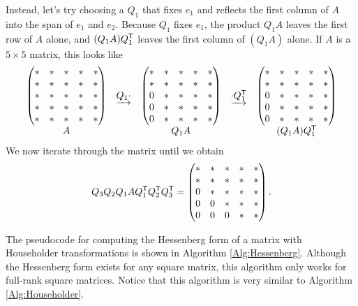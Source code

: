 Instead, let's try choosing a $Q_1$ that fixes $e_1$ and reflects the first column of $A$ into the span of $e_1$ and $e_2$. 
Because $Q_1$ fixes $e_1$, the product $Q_1A$ leaves the first row of $A$ alone, and $(Q_1A)Q_1^{\mathsf T}$ leaves the first column of $(Q_1A)$ alone.
If $A$ is a $5 \times 5$ matrix, this looks like
\[
\begin{array}{ccccc}
\begin{pmatrix}
* & * & * & * & * \\
* & * & * & * & * \\
* & * & * & * & * \\
* & * & * & * & * \\
* & * & * & * & *
\end{pmatrix}
&\underrightarrow{Q_1 \cdot }&
\begin{pmatrix}
* & * & * & * & * \\
* & * & * & * & * \\
0 & * & * & * & * \\
0 & * & * & * & * \\
0 & * & * & * & *
\end{pmatrix}
&\underrightarrow{\cdot Q_1^{\mathsf T}}&
\begin{pmatrix}
* & * & * & * & * \\
* & * & * & * & * \\
0 & * & * & * & * \\
0 & * & * & * & * \\
0 & * & * & * & *
\end{pmatrix}
\\
A & & Q_1A & & (Q_1 A) Q_1^{\mathsf T}
  \end{array}
\]
We now iterate through the matrix until we obtain
\begin{equation*}
Q_3 Q_2 Q_1 A Q_1^{\mathsf T} Q_2 ^{\mathsf T} Q_3^{\mathsf T} =
\begin{pmatrix}
* & * & * & * & * \\
* & * & * & * & * \\
0 & * & * & * & * \\
0 & 0 & * & * & * \\
0 & 0 & 0 & * & *
\end{pmatrix}.
\end{equation*}

The pseudocode for computing the Hessenberg form of a matrix with Householder transformations is shown in Algorithm \ref{Alg:Hessenberg}.
Although the Hessenberg form exists for any square matrix, this algorithm only works for full-rank square matrices.
Notice that this algorithm is very similar to Algorithm \ref{Alg:Householder}.


